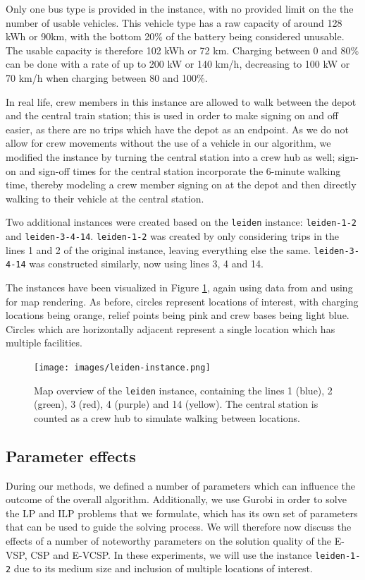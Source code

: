 \documentclass[]{article}
\begin{document}
Only one bus type is provided in the instance, with no provided limit on the the number of usable vehicles. This vehicle type has a raw capacity of around 128 kWh or 90km, with the bottom 20\% of the battery being considered unusable. The usable capacity is therefore 102 kWh or 72 km. Charging between 0 and 80\% can be done with a rate of up to 200 kW or 140 km/h, decreasing to 100 kW or 70 km/h when charging between 80 and 100\%.

In real life, crew members in this instance are allowed to walk between the depot and the central train station; this is used in order to make signing on and off easier, as there are no trips which have the depot as an endpoint. As we do not allow for crew movements without the use of a vehicle in our algorithm, we modified the instance by turning the central station into a crew hub as well; sign-on and sign-off times for the central station incorporate the 6-minute walking time, thereby modeling a crew member signing on at the depot and then directly walking to their vehicle at the central station. 

Two additional instances were created based on the \texttt{leiden} instance: \texttt{leiden-1-2} and \texttt{leiden-3-4-14}. \texttt{leiden-1-2} was created by only considering trips in the lines 1 and 2 of the original instance, leaving everything else the same. \texttt{leiden-3-4-14} was constructed similarly, now using lines 3, 4 and 14.

The instances have been visualized in Figure \ref{fig:leiden-map}, again using data from \citet{OpenStreetMap2025} and using \citet{QGIS2025} for map rendering. As before, circles represent locations of interest, with charging locations being orange, relief points being pink and crew bases being light blue. Circles which are horizontally adjacent represent a single location which has multiple facilities.

\begin{figure}[h]
  \centering
  \texttt{[image: images/leiden-instance.png]}
  \caption{Map overview of the \texttt{leiden} instance, containing the lines 1 (blue), 2 (green), 3 (red), 4 (purple) and 14 (yellow). The central station is counted as a crew hub to simulate walking between locations.}
  \label{fig:leiden-map}
\end{figure}

\subsection{Parameter effects} \label{sec:parameter-selection}
During our methods, we defined a number of parameters which can influence the outcome of the overall algorithm. Additionally, we use Gurobi in order to solve the LP and ILP problems that we formulate, which has its own set of parameters that can be used to guide the solving process. We will therefore now discuss the effects of a number of noteworthy parameters on the solution quality of the E-VSP, CSP and E-VCSP. In these experiments, we will use the instance \texttt{leiden-1-2} due to its medium size and inclusion of multiple locations of interest. 
\end{document}
